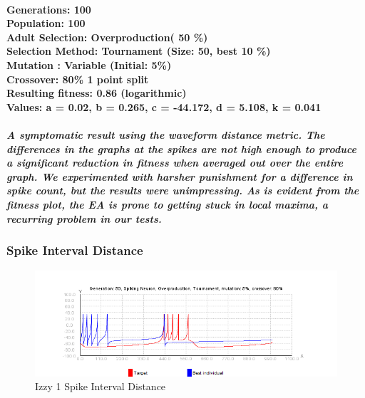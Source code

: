 \documentclass[titlepage,norsk]{article}
\begin{document}
\paragraph{
Generations: 100\\
Population: 100\\
Adult Selection: Overproduction( 50 \%)\\
Selection Method: Tournament (Size: 50, best 10 \%) \\
Mutation : Variable (Initial: 5\%)\\
Crossover: 80\% 1 point split \\
Resulting fitness: 0.86 (logarithmic) \\
Values: a = 0.02, b = 0.265, c = -44.172, d = 5.108, k = 0.041 \\
}

\subparagraph{A symptomatic result using the waveform distance metric. The differences in the graphs at the spikes are not high enough to produce a significant reduction in fitness when averaged out over the entire graph. We experimented with harsher punishment for a difference in spike count, but the results were unimpressing. As is evident from the fitness plot, the EA is prone to getting stuck in local maxima, a recurring problem in our tests. }

\subsubsection{Spike Interval Distance}

\begin{figure}[h!]
\centering
\includegraphics[scale=0.75]{izzy1interval.png}
\caption{Izzy 1 Spike Interval Distance}
\label{fig:awesome_image}
\end{figure}
\end{document}
